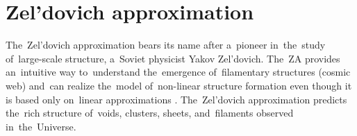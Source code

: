 \section{Zel'dovich approximation}
The~Zel'dovich approximation \parencite[hereafter ZA;][]{1970A&A.....5...84Z} bears its name after a~pioneer in~the~study of~large-scale structure, a~Soviet physicist Yakov Zel'dovich. The~ZA provides an~intuitive way to~understand the~emergence of~filamentary structures (cosmic web) and~can realize the~model of~non-linear structure formation even though it is based only on~linear approximations \parencite{2014MNRAS.439.3630W}. The~Zel’dovich approximation predicts the~rich structure of~voids, clusters, sheets, and~filaments observed in~the~Universe.

